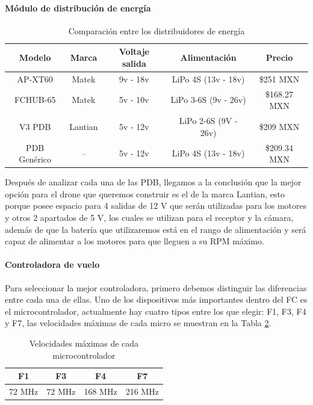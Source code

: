 \documentclass[pdflatex,sn-mathphys-num]{sn-jnl}%
\begin{document}
\paragraph{Módulo de distribución de energía}

\begin{table}[!h]
\centering
\caption{Comparación entre los distribuidores de energía}
\label{tab:pdb_comparison}
\begin{tabular}{|c|c|c|c|c|}
\hline
\textbf{Modelo} & \textbf{Marca} & \textbf{Voltaje salida} & \textbf{Alimentación} & \textbf{Precio} \\
\hline
AP-XT60 & Matek & 9v - 18v & LiPo 4S (13v - 18v) & \$251 MXN \\
\hline
FCHUB-65 & Matek & 5v - 10v & LiPo 3-6S (9v - 26v) & \$168.27 MXN \\
\hline
V3 PDB & Lantian & 5v - 12v & LiPo 2-6S (9V - 26v) & \$209 MXN \\
\hline
PDB Genérico & -- & 5v - 12v & LiPo 4S (13v - 18v) & \$209.34 MXN \\
\hline
\end{tabular}
\end{table}

Después de analizar cada una de las PDB, llegamos a la conclusión que la mejor opción para el drone que queremos construir es el de la marca Lantian, esto porque posee espacio para 4 salidas de 12 V que serán utilizadas para los motores y otros 2 apartados de 5 V, los cuales se utilizan para el receptor y la cámara, además de que la batería que utilizaremos está en el rango de alimentación y será capaz de alimentar a los motores para que lleguen a su RPM máximo.

\paragraph{Controladora de vuelo}

Para seleccionar la mejor controladora, primero debemos distinguir las diferencias entre cada una de ellas. Uno de los dispositivos más importantes dentro del FC es el microcontrolador, actualmente hay cuatro tipos entre los que elegir: F1, F3, F4 y F7, las velocidades máximas de cada micro se muestran en la Tabla \ref{tab:microcontroller_speeds}.

\begin{table}[!h]
\centering
\caption{Velocidades máximas de cada microcontrolador}
\label{tab:microcontroller_speeds}
\begin{tabular}{|c|c|c|c|}
\hline
\textbf{F1} & \textbf{F3} & \textbf{F4} & \textbf{F7} \\
\hline
72 MHz & 72 MHz & 168 MHz & 216 MHz \\
\hline
\end{tabular}
\end{table}
\end{document}
